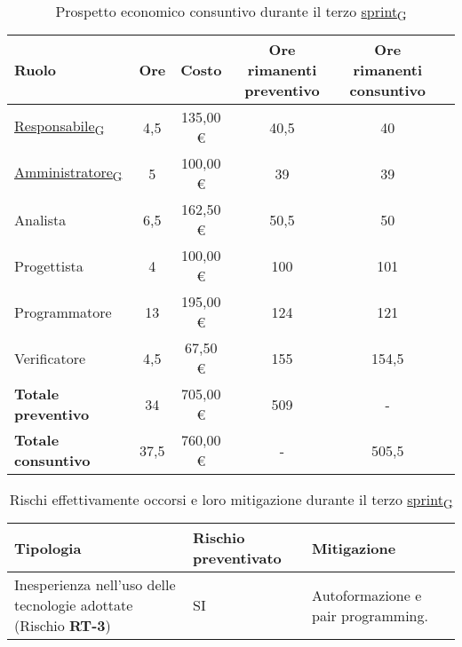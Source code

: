 \begin{table}[!h]
	\centering
	\begin{tabular}{ | l | c | c | c | c | c | }
		\hline
		\textbf{Ruolo}             & \textbf{Ore} & \textbf{Costo} & \textbf{Ore rimanenti preventivo} & \textbf{Ore rimanenti consuntivo} \\
		\hline
		\href{https://7last.github.io/docs/rtb/documentazione-interna/glossario\#responsabile}{Responsabile\textsubscript{G}}               & 4,5          & 135,00 €       & 40,5                              & 40                                \\
		\href{https://7last.github.io/docs/rtb/documentazione-interna/glossario\#amministratore}{Amministratore\textsubscript{G}}             & 5            & 100,00 €       & 39                                & 39                                \\
		Analista                   & 6,5          & 162,50 €       & 50,5                              & 50                                \\
		Progettista                & 4            & 100,00 €       & 100                               & 101                               \\
		Programmatore              & 13           & 195,00 €       & 124                               & 121                               \\
		Verificatore               & 4,5          & 67,50 €        & 155                               & 154,5                             \\
		\hline
		\textbf{Totale preventivo} & 34           & 705,00 €       & 509                               & -                                 \\
		\hline
		\textbf{Totale consuntivo} & 37,5         & 760,00 €       & -                                 & 505,5                             \\
		\hline
	\end{tabular}
	\caption{Prospetto economico consuntivo durante il terzo \href{https://7last.github.io/docs/rtb/documentazione-interna/glossario\#sprint}{sprint\textsubscript{G}}}
	
\end{table}

\begin{table}[!h]
	\centering
	\begin{tabular}{ | p{6cm} | p{2.5cm} | p{7.5cm} | }
		\hline
		\textbf{Tipologia}                                                      & \textbf{Rischio preventivato} & \textbf{Mitigazione}               \\
		\hline
		Inesperienza nell'uso delle tecnologie adottate (Rischio \textbf{RT-3}) & SI                            & Autoformazione e pair programming. \\
		\hline
	\end{tabular}
	\caption{Rischi effettivamente occorsi e loro mitigazione durante il terzo \href{https://7last.github.io/docs/rtb/documentazione-interna/glossario\#sprint}{sprint\textsubscript{G}}}
	
\end{table}

